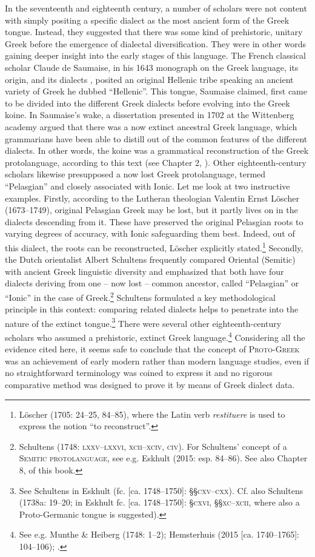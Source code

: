 \documentclass[output=paper]{langsci/langscibook}
\begin{document}
In the seventeenth and eighteenth century, a number of scholars were not content with simply positing a specific dialect as the most ancient form of the Greek tongue. Instead, they suggested that there was some kind of prehistoric, unitary Greek before the emergence of dialectal diversification. They were in other words gaining deeper insight into the early stages of this language. The French classical scholar Claude de Saumaise, in his 1643 monograph on the Greek language, its origin, and its dialects \citep{Saumaise1643a}, posited an original Hellenic tribe speaking an ancient variety of Greek he dubbed “Hellenic”. This tongue, Saumaise claimed, first came to be divided into the different Greek dialects before evolving into the Greek koine. In Saumaise’s wake, a dissertation presented in 1702 at the Wittenberg academy argued that there was a now extinct ancestral Greek language, which grammarians have been able to distill out of the common features of the different dialects. In other words, the koine was a grammatical reconstruction of the Greek protolanguage, according to this text (see Chapter 2, ). Other eighteenth-century scholars likewise presupposed a now lost Greek protolanguage, termed “Pelasgian” and closely associated with Ionic. Let me look at two instructive examples. Firstly, according to the Lutheran theologian Valentin Ernst Löscher (1673–1749), original Pelasgian Greek may be lost, but it partly lives on in the dialects descending from it. These have preserved the original Pelasgian roots to varying degrees of accuracy, with Ionic safeguarding them best. Indeed, out of this dialect, the roots can be reconstructed, Löscher explicitly stated.\footnote{Löscher (1705: 24–25, 84–85), where the Latin verb \textit{restituere} is used to express the notion “to reconstruct”.} Secondly, the Dutch orientalist Albert Schultens frequently compared Oriental (Semitic) with ancient Greek linguistic diversity and emphasized that both have four dialects deriving from one – now lost – common ancestor, called “Pelasgian” or “Ionic” in the case of Greek.\footnote{Schultens (1748: \textsc{lxxv–lxxvi,} \textsc{xcii–xciv,} \textsc{civ}). For Schultens’ concept of a \textsc{Semitic} \textsc{protolanguage}, see e.g. Eskhult (2015: esp. 84–86). See also Chapter 8,  of this book.} Schultens formulated a key methodological principle in this context: comparing related dialects helps to penetrate into the nature of the extinct tongue.\footnote{See Schultens in Eskhult (fc. [ca. 1748–1750]: §§\textsc{cxv–cxx}). Cf. also Schultens (1738a: 19–20; in Eskhult fc. [ca. 1748–1750]: §\textsc{cxvi}, §§\textsc{xc–xcii,} where also a Proto-Germanic tongue is suggested).} There were several other eighteenth-century scholars who assumed a prehistoric, extinct Greek language.\footnote{See e.g. Munthe \& Heiberg (1748: 1–2); Hemsterhuis (2015 [ca. 1740–1765]: 104–106); \citet[15]{Wise1758}.} Considering all the evidence cited here, it seems safe to conclude that the concept of \textsc{Proto-Greek} was an achievement of early modern rather than modern language studies, even if no straightforward terminology was coined to express it and no rigorous comparative method was designed to prove it by means of Greek dialect data.
\end{document}
